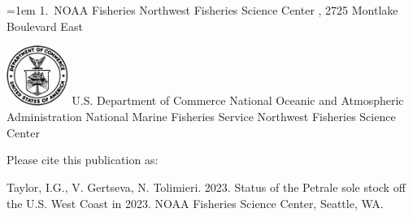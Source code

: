 \documentclass[
]{scrartcl}
\renewcommand*\contentsname{Table of contents}
\newcommand\contentsname{Table of contents}
\begin{document}
\begin{titlepage}
\begin{minipage}[b][\textheight][s]{\textwidth}
  \vspace{2\baselineskip}

  \hangindent=1em
  {1}.~{NOAA Fisheries Northwest Fisheries Science Center}%
  , %
  {2725 Montlake Boulevard East}%


  \vspace{1\baselineskip}



  \vfill


  \vspace{1\baselineskip}

  \includegraphics[alt={},width=2cm]{support_files/us_doc_logo.png}\newline %
  U.S. Department of Commerce\newline
  National Oceanic and Atmospheric Administration\newline
  National Marine Fisheries Service\newline
  Northwest Fisheries Science Center\newline

  \end{minipage}
  \restoregeometry
  \end{titlepage}

\renewcommand*\contentsname{Table of contents}
{
\hypersetup{linkcolor=}
\setcounter{tocdepth}{3}
\tableofcontents
}
\listoffigures
\listoftables

\newpage{}

Please cite this publication as:

Taylor, I.G., V. Gertseva, N. Tolimieri. 2023. Status of the Petrale
sole stock off the U.S. West Coast in 2023. NOAA Fisheries Science
Center, Seattle, WA.
\end{document}
